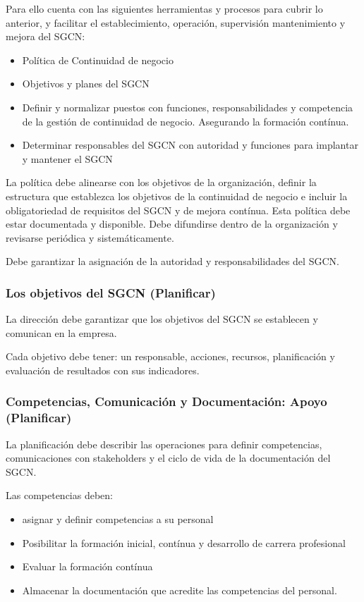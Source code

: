         Para ello cuenta con las siguientes herramientas y procesos para cubrir lo anterior, y facilitar el establecimiento, operación, supervisión mantenimiento y mejora del SGCN:
        \begin{itemize}
            \item Política de Continuidad de negocio
            \item Objetivos y planes del SGCN
            \item Definir y normalizar puestos con funciones, responsabilidades y competencia de la gestión de continuidad de negocio. Asegurando la formación contínua.
            \item Determinar responsables del SGCN con autoridad y funciones para implantar y mantener el SGCN
        \end{itemize}

        La política debe alinearse con los objetivos de la organización, definir la estructura que establezca los objetivos de la continuidad de negocio e incluir la obligatoriedad de requisitos del SGCN y de mejora contínua. Esta política debe estar documentada y disponible. Debe difundirse dentro de la organización y revisarse periódica y sistemáticamente.

        Debe garantizar la asignación de la autoridad y responsabilidades del SGCN.

    \subsubsection{Los objetivos del SGCN (Planificar)} %
        La dirección debe garantizar que los objetivos del SGCN se establecen y comunican en la empresa.

        Cada objetivo debe tener: un responsable, acciones, recursos, planificación y evaluación de resultados con sus indicadores.

    \subsubsection{Competencias, Comunicación y Documentación: Apoyo (Planificar)} %
        La planificación debe describir las operaciones para definir competencias, comunicaciones con stakeholders y el ciclo de vida de la documentación del SGCN.

        Las competencias deben:
        \begin{itemize}
            \item asignar y definir competencias a su personal
            \item Posibilitar la formación inicial, contínua y desarrollo de carrera profesional
            \item Evaluar la formación contínua
            \item Almacenar la documentación que acredite las competencias del personal.
        \end{itemize}


